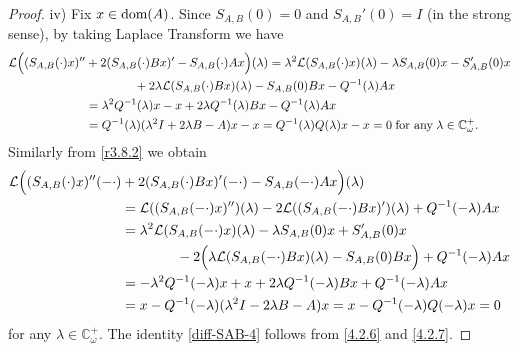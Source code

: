 \documentclass[11pt]{amsart}
\numberwithin{equation}{section}
\newcommand{\SAB}{S_{A,B}}
\theoremstyle{remark}
\theoremstyle{definition}
\newcommand{\dom}{\text{\rm{dom}}}
\begin{document}
\begin{proof}
	iv) Fix $x \in \dom(A)$. Since $\SAB(0)=0$ and $\SAB'(0)=I$ (in the strong sense), by taking Laplace Transform we have
	\begin{align}\label{4.2.6}
		\mathcal{L}\Bigl((\SAB(\cdot)x)''&+ 2(\SAB(\cdot)Bx)' - \SAB(\cdot)Ax\Bigr)(\lambda)
		= \lambda^2\mathcal{L}(\SAB(\cdot)x)(\lambda) - \lambda\SAB(0)x- \SAB'(0)x \notag\\
		&\qquad\qquad + 2\lambda\mathcal{L}(\SAB(\cdot)Bx)(\lambda)-\SAB(0)Bx - Q^{-1}(\lambda)Ax \notag\\
		&= \lambda^2 Q^{-1}(\lambda)x - x + 2\lambda Q^{-1}(\lambda)Bx - Q^{-1}(\lambda)Ax \notag\\
		&= Q^{-1}(\lambda)(\lambda^2 I+ 2\lambda B - A)x - x = Q^{-1}(\lambda)Q(\lambda)x - x = 0\;\mbox{for any}\;\lambda \in \mathbb{C}_\omega^+. 
	\end{align}
	Similarly from \eqref{r3.8.2} we obtain
	\begin{align}\label{4.2.7}
		\mathcal{L}\Bigl((\SAB(\cdot)x)''(-\cdot)&+ 2(\SAB(\cdot)Bx)'(-\cdot) - \SAB(-\cdot)Ax\Bigr)(\lambda)\notag\\
		&= \mathcal{L}((\SAB(-\cdot)x)'')(\lambda)- 2\mathcal{L}((\SAB(-\cdot)Bx)')(\lambda) + Q^{-1}(-\lambda)Ax\notag\\ 
		&= \lambda^2\mathcal{L}(\SAB(-\cdot)x)(\lambda) - \lambda\SAB(0)x + \SAB'(0)x \notag\\
		&\qquad\qquad - 2\Bigl(\lambda\mathcal{L}(\SAB(-\cdot)Bx)(\lambda) - \SAB(0)Bx\Bigr) + Q^{-1}(-\lambda)Ax \notag\\
		&= -\lambda^2 Q^{-1}(-\lambda)x + x + 2\lambda Q^{-1}(-\lambda)Bx + Q^{-1}(-\lambda)Ax \notag\\
		&= x - Q^{-1}(-\lambda)(\lambda^2 I - 2\lambda B - A)x = x - Q^{-1}(-\lambda)Q(-\lambda)x = 0
	\end{align}
	for any $\lambda \in \mathbb{C}_\omega^+$. The identity \eqref{diff-SAB-4} follows from \eqref{4.2.6} and \eqref{4.2.7}.
\end{proof}
\end{document}
